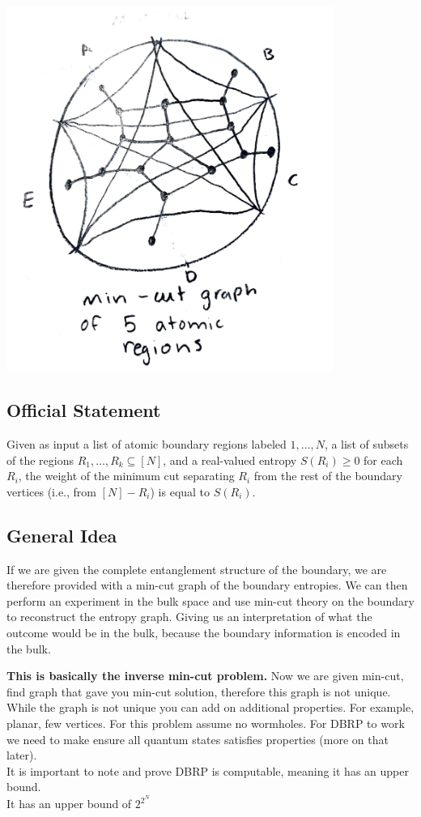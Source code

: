 \documentclass[12pt]{article}
\begin{document}
\begin{center}
    \includegraphics[width=0.8\textwidth]{min_cut_graph.pdf}
\end{center}

\subsection*{Official Statement}
Given as input a list of atomic boundary regions labeled \( 1, \dots, N \), a list of subsets of the regions \( R_1, \dots, R_k \subseteq [N] \), and a real-valued entropy \( S(R_i) \geq 0 \) for each \( R_i \), the weight of the minimum cut separating \( R_i \) from the rest of the boundary vertices (i.e., from \( [N] - R_i \)) is equal to \( S(R_i) \).

\subsection*{General Idea}
If we are given the complete entanglement structure of the boundary, we are therefore provided with a min-cut graph of the boundary entropies. We can then perform an experiment in the bulk space and use min-cut theory on the boundary to reconstruct the entropy graph. Giving us an interpretation of what the outcome would be in the bulk, because the boundary information is encoded in the bulk.

\textbf{This is basically the inverse min-cut problem.} Now we are given min-cut, find graph that gave you min-cut solution, therefore this graph is not unique. While the graph is not unique you can add on additional properties. For example, planar, few vertices. For this problem assume no wormholes. For DBRP to work we need to make ensure all quantum states satisfies properties (more on that later). \\
It is important to note and prove DBRP is computable, meaning it has an upper bound. \\
It has an upper bound of $2^{2^N}$
\end{document}
